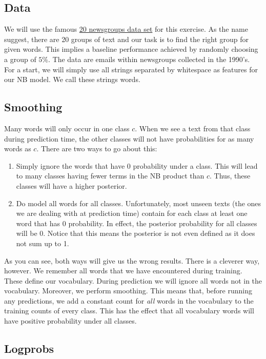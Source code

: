 \documentclass[11pt, a4paper]{article}
\begin{document}
\subsection{Data}

We will use the famous \href{http://qwone.com/~jason/20Newsgroups/}{20 newsgroups data set} for this 
exercise. As the name suggest, there are 20 groups of text and our task is to find the right group for given words. This
implies a baseline performance achieved by randomly choosing a group of $ 5\% $. The data are emails
within newsgroups collected in the 1990's. For a start, we will simply use all strings separated by
whitespace as features for our NB model. We call these strings words.

\subsection{Smoothing}

Many words will only occur in one class $ c $. When we see a text from that class during prediction time, the
other classes will not have probabilities for as many words as $ c $. There are two ways to go about this:
\begin{enumerate}
\item Simply ignore the words that have 0 probability under a class. This will lead to many classes
having fewer terms in the NB product than $ c $. Thus, these classes will have a higher posterior.
\item Do model all words for all classes. Unfortunately, most unseen texts (the ones we are dealing
with at prediction time) contain for each class at least one word that has 0 probability. In effect, the
posterior probability for all classes will be 0. Notice that this means the posterior is not even defined
as it does not sum up to 1.
\end{enumerate} 

As you can see, both ways will give us the wrong results. There is a cleverer way, however. We remember
all words that we have encountered during training. These define our vocabulary. During prediction we
will ignore all words not in the vocabulary. Moreover, we perform smoothing. This means that, before running any predictions, we add a constant count for \textit{all} words in the vocabulary to the training counts
of every class. This has the effect that all vocabulary words will have positive probability under
all classes. 

\subsection{Logprobs}
\end{document}
